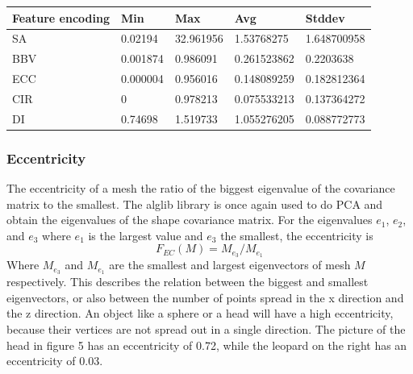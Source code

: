\documentclass{bigdata}
\begin{document}
\begin{center}
    \begin{tabular}{ l | l | l | l | l }
    \hline
    Feature encoding & Min & Max & Avg & Stddev \\ \hline
    SA & 0.02194 & 32.961956 & 1.53768275 & 1.648700958 \\ 
    BBV & 0.001874 & 0.986091 & 0.261523862 & 0.2203638 \\
    ECC & 0.000004 & 0.956016 & 0.148089259 & 0.182812364 \\ 
	CIR & 0 & 0.978213 & 0.075533213 & 0.137364272 \\ 
	DI & 0.74698 & 1.519733 & 1.055276205  & 0.088772773 \\ 	
    \end{tabular}
\end{center}

\subsubsection{Eccentricity}
The eccentricity of a mesh the ratio of the biggest eigenvalue of the covariance matrix to the smallest. The alglib library is once again used to do PCA and obtain the eigenvalues of the shape covariance matrix. For the eigenvalues $e_1$, $e_2$, and $e_3$ where $e_1$ is the largest value and $e_3$ the smallest, the eccentricity is
\begin{equation}
F_{EC}(M) = M_{e_3} / M_{e_1}
\end{equation}
Where $M_{e_3}$ and $M_{e_1}$ are the smallest and largest eigenvectors of mesh $M$ respectively. This describes the relation between the biggest and smallest eigenvectors, or also between the number of points spread in the x direction and the z direction. An object like a sphere or a head will have a high eccentricity, because their vertices are not spread out in a single direction. The picture of the head in figure 5 has an eccentricity of 0.72, while the leopard on the right has an eccentricity of 0.03.
\end{document}
